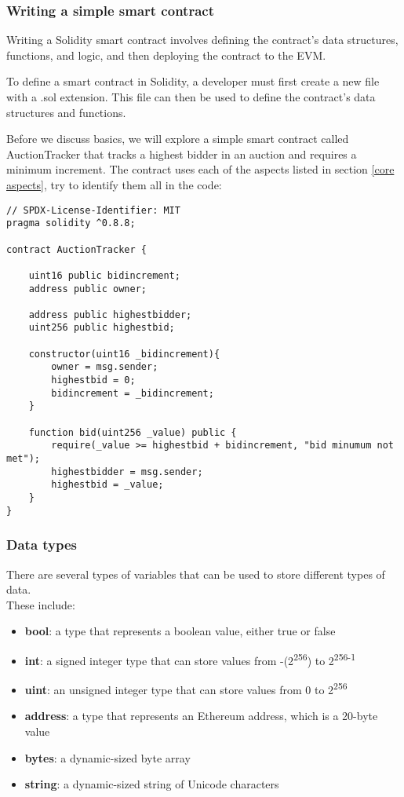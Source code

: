 \documentclass{article}
\theoremstyle{theorem}
\theoremstyle{definition}
\theoremstyle{remark}
\begin{document}
\subsubsection{Writing a simple smart contract} \label{simple contract}
\medskip\noindent
Writing a Solidity smart contract involves defining the contract's data structures, functions, and logic, and then deploying the contract to the EVM.

\medskip\noindent
To define a smart contract in Solidity, a developer must first create a new file with a .sol extension. This file can then be used to define the contract's data structures and functions.

\medskip\noindent
Before we discuss basics, we will explore a simple smart contract called AuctionTracker that tracks a highest bidder in an auction and requires a minimum increment. The contract uses each of the aspects listed in section \ref{core aspects}, try to identify them all in the code:
\begin{itemize}
\begin{lstlisting}
// SPDX-License-Identifier: MIT
pragma solidity ^0.8.8;

contract AuctionTracker {

    uint16 public bidincrement;
    address public owner;
    
    address public highestbidder;
    uint256 public highestbid;
    
    constructor(uint16 _bidincrement){
        owner = msg.sender;
        highestbid = 0;
        bidincrement = _bidincrement;
    }

    function bid(uint256 _value) public {
        require(_value >= highestbid + bidincrement, "bid minumum not met");
        highestbidder = msg.sender;
        highestbid = _value;
    }
}
\end{lstlisting}
\end{itemize}

\subsubsection{Data types} \label{data}
\medskip\noindent
There are several types of variables that can be used to store different types of data. \\These include:
\begin{itemize}
    \item \textbf{bool}: a type that represents a boolean value, either true or false
    \item \textbf{int}: a signed integer type that can store values from -(2\textsuperscript{256}) to 2\textsuperscript{256-1}
    \item \textbf{uint}: an unsigned integer type that can store values from 0 to 2\textsuperscript{256}
    \item \textbf{address}: a type that represents an Ethereum address, which is a 20-byte value
    \item \textbf{bytes}: a dynamic-sized byte array
    \item \textbf{string}: a dynamic-sized string of Unicode characters


\end{itemize}
\end{document}
